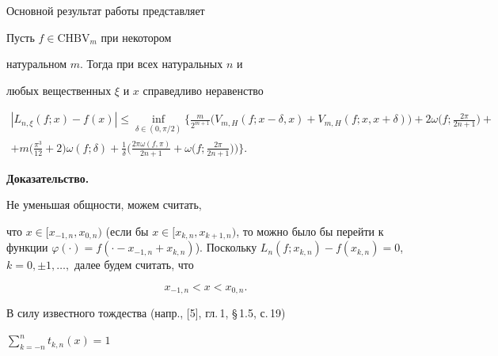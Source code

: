 Основной результат работы представляет





\begin{thm} Пусть $f\in \mathrm{CHBV}_m$ при некотором


натуральном $m$. Тогда при всех натуральных $n$ и


любых вещественных $\xi$ и $x$ справедливо неравенство


\begin{multline}


|L_{n,\xi}(f;x)-f(x)|\le\inf_{\delta\in(0,\pi/2)}


\bigg\{\frac m{2^{m+1}}\big(V_{m,H}(f;x-\delta,x)+


V_{m,H}(f;x,x+\delta)\big)+2\omega\bigg(f;\frac


{2\pi}{2n+1}\bigg)+ \\


%


+m\bigg(\frac{\pi^3}{12}+2\bigg)\omega(f;\delta)+


\frac 1{\delta}\bigg(\frac{2\pi\omega(f,\pi)}{2n+1}+\omega


\bigg(f;\frac{2\pi}{2n+1}\bigg)\bigg)\bigg\}.


\end{multline}


\end{thm}





{\bf Доказательство.}


Не уменьшая общности, можем считать,


что $x\in[x_{-1,n},x_{0,n})$ (если бы $x\in[x_{k,n},x_


{k+1,n})$, то можно было бы перейти к функции $\varphi(\cdot)=f


(\cdot -x_{-1,n}+x_{k,n})$). Поскольку $L_n(f;x_{k,n})


-f(x_{k,n})=0$, $k=0,\pm 1,\dotsc,$ далее будем считать, что


\begin{equation}


x_{-1,n}<x<x_{0,n}.


\end{equation}





В силу известного тождества (напр., [5], гл.\,1, \S\,1.5, с.\,19)


$\sum\limits_{k=-n}^nt_{k,n}(x)=1$


